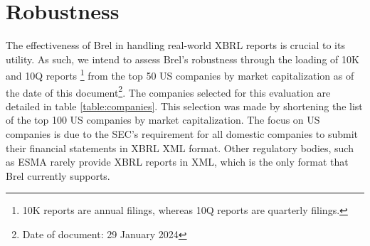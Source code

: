 \section{Robustness}
\label{sec:robustness}


The effectiveness of Brel in handling real-world XBRL reports is crucial to its utility.
As such, we intend to assess Brel's robustness through the loading of 10K and 10Q reports
\footnote{10K reports are annual filings, whereas 10Q reports are quarterly filings.}
from the top 50 US companies by market capitalization as of the date of this document\footnote{Date of document: 29 January 2024}.
The companies selected for this evaluation are detailed in table \ref{table:companies}.
This selection was made by shortening the list of the top 100 US companies by market capitalization\cite{largest_us_companies}.
The focus on US companies is due to the SEC's requirement for all domestic companies to submit their financial statements in XBRL XML format\cite{sec_ixbrl}.
Other regulatory bodies, such as ESMA rarely provide XBRL reports in XML, which is the only format that Brel currently supports.

